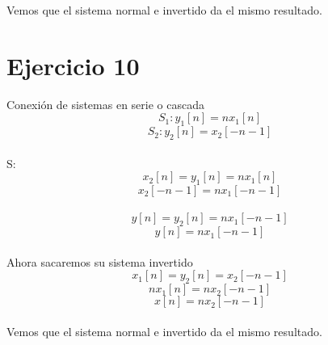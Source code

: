 \documentclass[10pt,a4paper]{report}
\begin{document}
Vemos que el sistema normal e invertido da el mismo resultado.

\section{Ejercicio 10}

Conexión de sistemas en serie o cascada\\

\[
S_{1}: y_{1}\left [ n \right ]=nx_{1}\left [ n \right ]
\]
\[
S_{2}: y_{2}\left [ n \right ]=x_{2}\left [ -n-1 \right ]
\]\\

S:\\

\[
x_{2}\left [ n \right ]=y_{1}\left [ n \right ]=nx_{1}\left [ n \right ]
\]
\[
x_{2}\left [ -n-1 \right ]=nx_{1}\left [ -n-1 \right ]
\]\\

\[
y\left [ n \right ]=y_{2}\left [ n \right ]=nx_{1}\left [ -n-1 \right ]
\]
\[
y\left [ n \right ]=nx_{1}\left [ -n-1 \right ]
\]\\

Ahora sacaremos su sistema invertido\\
\[
x_{1}\left [ n \right ]=y_{2}\left [ n \right ]=x_{2}\left [ -n-1 \right ]
\]
\[
nx_{1}\left [ n \right ]=nx_{2}\left [ -n-1 \right ]
\]
\[
x\left [ n \right ]=nx_{2}\left [ -n-1 \right ]
\]\\

Vemos que el sistema normal e invertido da el mismo resultado.
\end{document}

